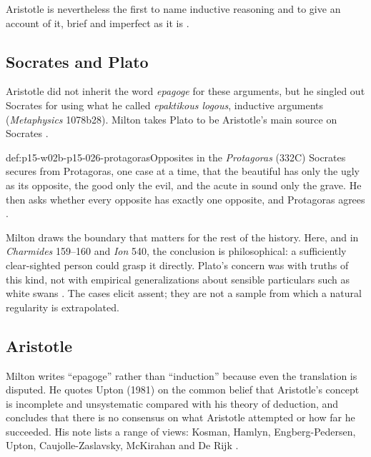 Aristotle is nevertheless the first to name inductive reasoning and to
give an account of it, brief and imperfect as it is
\cite[p.~2]{Milton2011InductionBeforeHume}.

\subsection{Socrates and Plato}

Aristotle did not inherit the word \emph{epagoge} for these arguments, but
he singled out Socrates for using what he called \emph{epaktikous logous},
inductive arguments (\emph{Metaphysics} 1078b28). Milton takes Plato to be
Aristotle's main source on Socrates
\cite[p.~2]{Milton2011InductionBeforeHume}.

\begin{hbexample}{def:p15-w02b-p15-026-protagoras}{Opposites in the \emph{Protagoras} (332C)}
Socrates secures from Protagoras, one case at a time, that the beautiful
has only the ugly as its opposite, the good only the evil, and the acute in
sound only the grave. He then asks whether every opposite has exactly one
opposite, and Protagoras agrees \cite[pp.~2--3]{Milton2011InductionBeforeHume}.

Milton draws the boundary that matters for the rest of the history. Here,
and in \emph{Charmides} 159--160 and \emph{Ion} 540, the conclusion is
philosophical: a sufficiently clear-sighted person could grasp it directly.
Plato's concern was with truths of this kind, not with empirical
generalizations about sensible particulars such as white swans
\cite[p.~3]{Milton2011InductionBeforeHume}. The cases elicit assent; they
are not a sample from which a natural regularity is extrapolated.
\end{hbexample}

\subsection{Aristotle}
\label{sec:p15-w02b-p15-026-aristotle}

Milton writes ``epagoge'' rather than ``induction'' because even the
translation is disputed. He quotes Upton (1981) on the common belief that
Aristotle's concept is incomplete and unsystematic compared with his theory
of deduction, and concludes that there is no consensus on what Aristotle
attempted or how far he succeeded. His note lists a range of views:
Kosman, Hamlyn, Engberg-Pedersen, Upton, Caujolle-Zaslavsky, McKirahan and
De Rijk \cite[p.~3]{Milton2011InductionBeforeHume}.

